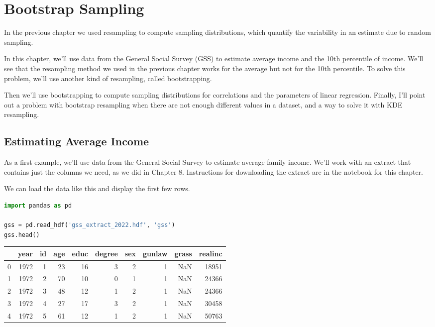 \chapter{Bootstrap Sampling}\label{bootstrap-sampling}

In the previous chapter we used resampling to compute sampling
distributions, which quantify the variability in an estimate due to
random sampling.

In this chapter, we'll use data from the General Social Survey (GSS) to
estimate average income and the 10th percentile of income. We'll see
that the resampling method we used in the previous chapter works for the
average but not for the 10th percentile. To solve this problem, we'll
use another kind of resampling, called bootstrapping.

Then we'll use bootstrapping to compute sampling distributions for
correlations and the parameters of linear regression. Finally, I'll
point out a problem with bootstrap resampling when there are not enough
different values in a dataset, and a way to solve it with KDE
resampling.

\section{Estimating Average Income}\label{estimating-average-income}

As a first example, we'll use data from the General Social Survey to
estimate average family income. We'll work with an extract that contains
just the columns we need, as we did in Chapter 8. Instructions for
downloading the extract are in the notebook for this chapter.

We can load the data like this and display the first few rows.

\begin{lstlisting}[language=Python,style=source]
import pandas as pd

gss = pd.read_hdf('gss_extract_2022.hdf', 'gss')
gss.head()
\end{lstlisting}

\begin{tabular}{lrrrrrrrrr}
\toprule
 & year & id & age & educ & degree & sex & gunlaw & grass & realinc \\
\midrule
0 & 1972 & 1 & 23 & 16 & 3 & 2 & 1 & NaN & 18951 \\
1 & 1972 & 2 & 70 & 10 & 0 & 1 & 1 & NaN & 24366 \\
2 & 1972 & 3 & 48 & 12 & 1 & 2 & 1 & NaN & 24366 \\
3 & 1972 & 4 & 27 & 17 & 3 & 2 & 1 & NaN & 30458 \\
4 & 1972 & 5 & 61 & 12 & 1 & 2 & 1 & NaN & 50763 \\
\bottomrule
\end{tabular}

